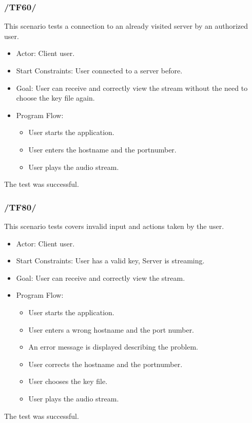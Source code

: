 \documentclass[a4paper,10pt]{scrartcl}
\begin{document}
\subsubsection{/TF60/}
This scenario tests a connection to an already visited server by an authorized user.

\begin{itemize}
	\item Actor: Client user.
	\item Start Constraints: User connected to a server before.
	\item Goal: User can receive and correctly view the stream without the need to choose the key file again.
	\item Program Flow:
	\begin{itemize}
   \item User starts the application.
   \item User enters the hostname and the portnumber.
   \item User plays the audio stream.
\end{itemize}
\end{itemize}
The test was successful.
\newpage

\subsubsection{/TF80/}
This scenario tests covers invalid input and actions taken by the user.

\begin{itemize}
	\item Actor: Client user.
	\item Start Constraints: User has a valid key, Server is streaming.
	\item Goal: User can receive and correctly view the stream.
	\item Program Flow:
	\begin{itemize}
   \item User starts the application.
   \item User enters a wrong hostname and the port number.
   \item An error message is displayed describing the problem.
 	 \item User corrects the hostname and the portnumber.
	 \item User chooses the key file.
   \item User plays the audio stream.
\end{itemize}
\end{itemize}
The test was successful.
\end{document}
